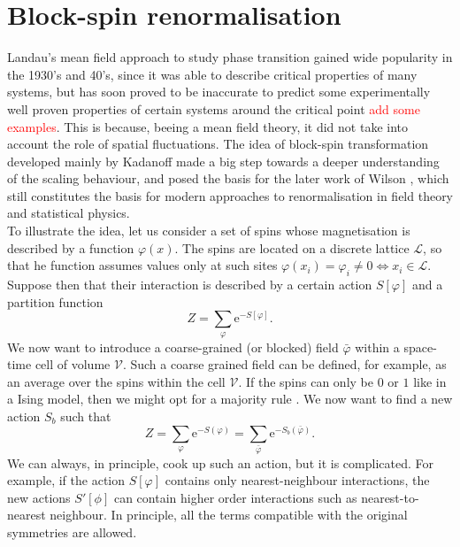 \section{Block-spin renormalisation}
Landau's mean field approach to study phase transition \cite{Landau:1937obd} gained wide popularity in the 1930's and 40's, since it was able to describe critical properties of many systems, but has soon proved to be inaccurate to predict some experimentally well proven properties of certain systems around the critical point \textcolor{red}{add some examples}. This is because, beeing a mean field theory, it did not take into account the role of spatial fluctuations.
\label{sec:blockspin}
The idea of block-spin transformation developed mainly by Kadanoff \cite{PhysicsPhysiqueFizika_2_263} made a big step towards a deeper understanding of the scaling behaviour, and posed the basis for the later work of Wilson \cite{WilsonRG1,WilsonRG2,WilsonFisher}, which still constitutes the basis for modern approaches to renormalisation in field theory and statistical physics.\\
To illustrate the idea, let us consider a set of spins whose magnetisation is described by a function $\varphi(x)$. The spins are located on a discrete lattice $\mathscr{L}$, so that he function assumes values only at such sites $\varphi(x_i) = \varphi_i \neq 0 \Leftrightarrow x_i \in \mathscr{L}$. Suppose then that their interaction is described by a certain action $S[\varphi]$ and a partition function
\begin{equation*}
    Z=\sum_{\varphi} \mathrm{e}^{-S[\varphi]}.
\end{equation*}
We now want to introduce a coarse-grained (or blocked) field $\bar\varphi$ within a space-time cell of volume $\mathcal{V}$. Such a coarse grained field can be defined, for example, as an average over the spins within the cell $\mathcal{V}$. If the spins can only be $0$ or $1$ like in a Ising model, then we might opt for a majority rule \cite{cardy_1996}.
We now want to find a new action $S_b$ such that 
\begin{equation}
    Z=\sum_{\varphi} \mathrm{e}^{-S(\varphi)}= \sum_{\bar\varphi} \mathrm{e}^{-S_b\left(\bar\varphi\right)}.
\end{equation}
We can always, in principle, cook up such an action, but it is complicated. For example, if the action $S[\varphi]$ contains only nearest-neighbour interactions, the new actions $S'[\phi]$ can contain higher order interactions such as nearest-to-nearest neighbour. In principle, all the terms compatible with the original symmetries are allowed.\\
